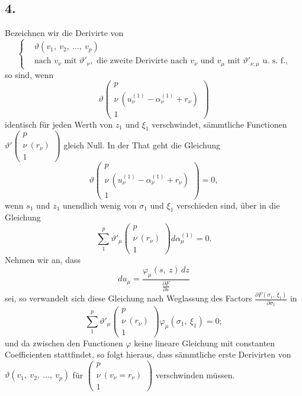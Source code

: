 \documentclass[12pt,a4paper]{book}
\theoremstyle{definition}
\theoremstyle{remark}
\begin{document}
\subsection*{4.}

Bezeichnen wir die Derivirte von
\begin{equation}
\tag{1}
\left\{
\begin{aligned}
&\vartheta(v_1,\ v_2,\ \ldots,\ v_p)\\
&\text{nach } v_\nu \text{ mit } \vartheta'_\nu, \text{ die zweite Derivirte nach } v_\nu \text{ und } v_\mu \text{ mit } \vartheta'_{\nu,\mu} \text{ u.~s.~f.,}
\end{aligned}
\right.
\end{equation}
so sind, wenn
\[ \vartheta\left(\begin{array}{c} p\\ \nu\ (u_\nu^{(1)} - \alpha_\nu^{(1)} + r_\nu)\\ 1 \end{array}\right) \]
identisch für jeden Werth von $z_1$ und $\xi_1$ verschwindet, sämmtliche Functionen $\vartheta'\left(\begin{array}{c} p\\ \nu\ (r_\nu)\\ 1 \end{array}\right)$ gleich Null. In der That geht die Gleichung
\[ \vartheta\left(\begin{array}{c} p\\ \nu\ (u_\nu^{(1)} - \alpha_\nu^{(1)} + r_\nu)\\ 1 \end{array}\right) = 0, \]
 wenn $s_1$ und $z_1$ unendlich wenig von $\sigma_1$ und $\xi_1$ verschieden sind, über in die Gleichung
\[ \sum_1^p \vartheta'_\mu\left(\begin{array}{c} p\\ \nu\ (r_\nu)\\ 1 \end{array}\right) d\alpha_\mu^{(1)} = 0. \]
Nehmen wir an, dass
\[ du_\mu = \frac{\varphi_\mu(s,\ z)\,dz}{\frac{\partial F}{\partial s}} \]
sei, so verwandelt sich diese Gleichung nach Weglassung des Factors $\frac{\partial F(\sigma_1,\ \xi_1)}{\partial \sigma_1}$ in
\[ \sum_1^p \vartheta'_\mu\left(\begin{array}{c} p\\ \nu\ (r_\nu)\\ 1 \end{array}\right) \varphi_\mu(\sigma_1,\ \xi_1) = 0; \]
und da zwischen den Functionen $\varphi$ keine lineare Gleichung mit constanten Coefficienten stattfindet, so folgt hieraus, dass sämmtliche erste Derivirten von $\vartheta(v_1,\ v_2,\ \ldots,\ v_p)$ für $\left(\begin{array}{c} p\\ \nu\ (v_\nu = r_\nu)\\ 1 \end{array}\right)$ verschwinden müssen.
\end{document}
